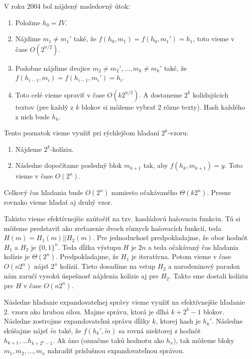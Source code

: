 V roku 2004 \cite{Joux04} bol nájdený nasledovný útok:
\begin{enumerate}
\item Položme $h_0 = IV$.
\item Nájdime $m_1 \neq m_1'$ také, že $f(h_0, m_1) = f(h_0, m_1') = h_1$, toto vieme v čase $O(2^{n/2})$.
\item Podobne nájdime dvojice $m_2 \neq m_2', \dots, m_k \neq m_k'$ také, že $f(h_{i-1}, m_i) = f(h_{i-1}, m_i') = h_i$.
\item Toto celé vieme spraviť v čase $O(k 2^{n/2})$. A dostaneme $2^k$ kolidujúcich textov (pre každý z $k$ blokov si môžeme vybrať
2 rôzne texty). Hash každého z nich bude $h_k$.
\end{enumerate}

Tento poznatok vieme využiť pri rýchlejšom hľadaní $2^k$-vzoru:
\begin{enumerate}
\item Nájdeme $2^k$-kolíziu.
\item Následne dopočítame posledný blok $m_{k+1}$ tak, aby $f(h_k, m_{k+1}) = y$. Toto vieme v čase $O(2^n)$.
\end{enumerate}

Celkový čas hľadania bude $O(2^n)$ namiesto očakávaného $\Theta(k 2^n)$. Presne rovnako vieme hľadať aj druhý vzor.

Takisto vieme efektívnejšie zaútočiť na tzv. kasdádovú hašovaciu funkciu. Tú si môžeme predstaviť ako zreťazenie
dvoch rôznych hašovacích funkcií, teda $H(m) = H_1(m)||H_2(m)$. Pre jednoduchosť predpokladajme, že obor hodnôt $H_1$
a $H_2$ je $\{0,1\}^n$. Teda dĺžka výstupu $H$ je $2n$ a teda očakávaný čas hľadania kolízie je $\Theta(2^n)$.
Predpokladajme, že $H_1$ je iteratívna. Potom vieme v čase $O(n 2^n)$ nájsť $2^n$ kolízií. Tieto dosadíme
na vstup $H_2$ a narodeninový paradox nám zaručí vysokú úspešnosť nájdenia kolízie aj pre $H_2$. Takto sme dostali
kolíziu pre $H$ v čase $O(n 2^n)$.


Následne hľadanie expandovateľnej správy vieme využiť na efektívnejšie hľadanie 2. vzoru ako hrubou silou.
Majme správu, ktorá je dlhá $k + 2^k - 1$ blokov. Následne zostrojme expandovateľnú správu dĺžky $k$, ktorej hash je $h_k'$.
Následne skúšajme nájsť  $\tilde{m}$ také, že $f(h_k', \tilde{m})$ sa rovná niektorej z hodnôt $h_{k+1}, \dots h_{k+2^k-1}$. Ak áno 
(označme takú hodnotu ako $h_x$), tak môžeme bloky $m_1, m_2, \dots, m_x$ nahradiť príslušnou expandovateľnou správou.

